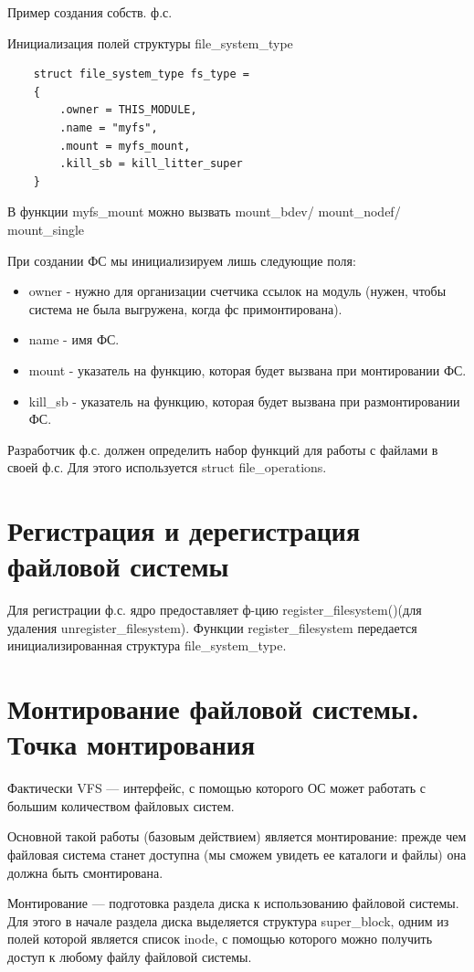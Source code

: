 Пример создания собств. ф.с.

Инициализация полей структуры file\_system\_type
\begin{lstlisting}
	struct file_system_type fs_type =
	{
		.owner = THIS_MODULE,
		.name = "myfs",
		.mount = myfs_mount,
		.kill_sb = kill_litter_super
	}
\end{lstlisting}

В функции myfs\_mount можно вызвать mount\_bdev/ mount\_nodef/ mount\_single

При создании ФС мы инициализируем лишь следующие поля:

\begin{itemize}[label=---]
	\item owner - нужно для организации счетчика ссылок на модуль (нужен, чтобы система не была выгружена, когда фс примонтирована).
	\item name - имя ФС.
	\item  mount - указатель на функцию, которая будет вызвана при монтировании ФС.
	\item kill\_sb - указатель на функцию, которая будет вызвана при размонтировании ФС.
\end{itemize}

Разработчик ф.с. должен определить набор функций для работы с файлами в своей ф.с. Для этого используется struct file\_operations.

\section{Регистрация и дерегистрация файловой системы}

Для регистрации ф.с. ядро предоставляет ф-цию register\_filesystem()(для удаления unregister\_filesystem). Функции register\_filesystem передается инициализированная структура file\_system\_type.


\section{Монтирование файловой системы. Точка монтирования}

Фактически VFS — интерфейс, с помощью которого ОС может работать с большим количеством файловых систем.

Основной такой работы (базовым действием) является монтирование: прежде чем файловая система станет доступна (мы сможем увидеть ее каталоги и файлы) она должна быть смонтирована.

Монтирование — подготовка раздела диска к использованию файловой системы. Для этого в начале раздела диска выделяется структура super\_block, одним из полей которой является список inode, с помощью которого можно получить доступ к любому файлу файловой системы.

